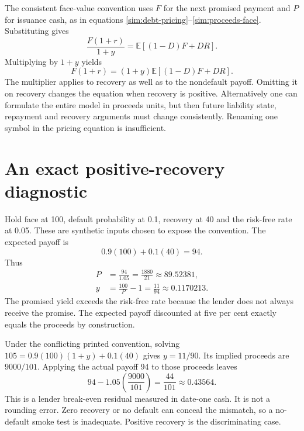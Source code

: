 The consistent face-value convention uses $F$ for the next promised payment and $P$ for issuance cash, as in equations \eqref{sim:debt-pricing}--\eqref{sim:proceeds-face}. Substituting gives
\begin{equation}
 \frac{F(1+r)}{1+y}=\mathbb E[(1-D)F+DR].
 \label{sim:face-price}
\end{equation}
Multiplying by $1+y$ yields
\begin{equation}
 F(1+r)=(1+y)\mathbb E[(1-D)F+DR].
\end{equation}
The multiplier applies to recovery as well as to the nondefault payoff. Omitting it on recovery changes the equation when recovery is positive. Alternatively one can formulate the entire model in proceeds units, but then future liability state, repayment and recovery arguments must change consistently. Renaming one symbol in the pricing equation is insufficient.

\section{An exact positive-recovery diagnostic}
Hold face at 100, default probability at 0.1, recovery at 40 and the risk-free rate at 0.05. These are synthetic inputs chosen to expose the convention. The expected payoff is
\begin{equation}
 0.9(100)+0.1(40)=94.
\end{equation}
Thus
\begin{align}
 P&=\frac{94}{1.05}=\frac{1880}{21}\approx89.52381,\\
 y&=\frac{100}{P}-1=\frac{11}{94}\approx0.1170213.
\end{align}
The promised yield exceeds the risk-free rate because the lender does not always receive the promise. The expected payoff discounted at five per cent exactly equals the proceeds by construction.

Under the conflicting printed convention, solving $105=0.9(100)(1+y)+0.1(40)$ gives $y=11/90$. Its implied proceeds are $9000/101$. Applying the actual payoff 94 to those proceeds leaves
\begin{equation}
 94-1.05\left(\frac{9000}{101}\right)=\frac{44}{101}\approx0.43564.
\end{equation}
This is a lender break-even residual measured in date-one cash. It is not a rounding error. Zero recovery or no default can conceal the mismatch, so a no-default smoke test is inadequate. Positive recovery is the discriminating case.

